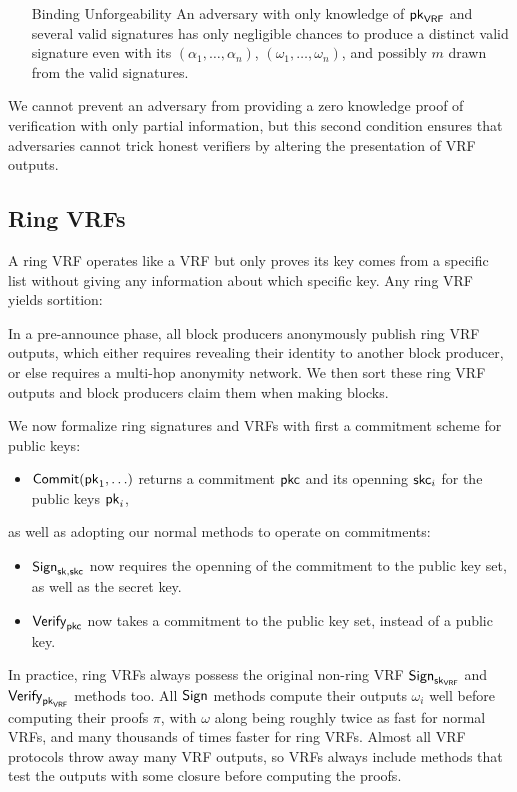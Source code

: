 \begin{enumerate}
\item[Binding Unforgeability] An adversary with only knowledge of $\mathsf{pk}_{\mathsf{VRF}}$ and several valid signatures has only negligible chances to produce a distinct valid signature even with its $(\alpha_1,\ldots,\alpha_n)$, $(\omega_1,\ldots,\omega_n)$, and possibly $m$ drawn from the valid signatures.
\end{enumerate}
We cannot prevent an adversary from providing a zero knowledge proof of verification with only partial information, but this second condition ensures that adversaries cannot trick honest verifiers by altering the presentation of VRF outputs.  

\subsection{Ring VRFs}

A ring VRF operates like a VRF but only proves its key comes from a specific list without giving any information about which specific key.  Any ring VRF yields sortition:

In a pre-announce phase, all block producers anonymously publish ring VRF outputs, which either requires revealing their identity to another block producer, or else requires a multi-hop anonymity network.  We then sort these ring VRF outputs and block producers claim them when making blocks.

We now formalize ring signatures and VRFs with first a commitment scheme for public keys:
\begin{itemize}
\item $\mathsf{Commit}(\mathsf{pk}_1,\ldots)$ returns a commitment $\mathsf{pkc}$ and its openning $\mathsf{skc}_i$ for the public keys $\mathsf{pk}_i$,
\end{itemize}
as well as adopting our normal methods to operate on commitments:
\begin{itemize}
\item $\mathsf{Sign}_{\mathsf{sk},\mathsf{skc}}$ now requires the openning of the commitment to the public key set, as well as the secret key.
\item $\mathsf{Verify}_{\mathsf{pkc}}$ now takes a commitment to the public key set, instead of a public key.
\end{itemize}
In practice, ring VRFs always possess the original non-ring VRF $\mathsf{Sign}_{\mathsf{sk}_{\mathsf{VRF}}}$ and $\mathsf{Verify}_{\mathsf{pk}_{\mathsf{VRF}}}$ methods too.  All $\mathsf{Sign}$ methods compute their outputs $\omega_i$ well before computing their proofs $\pi$, with $\omega$ along being roughly twice as fast for normal VRFs, and many thousands of times faster for ring VRFs.  Almost all VRF protocols throw away many VRF outputs, so VRFs always include methods that test the outputs with some closure before computing the proofs.

